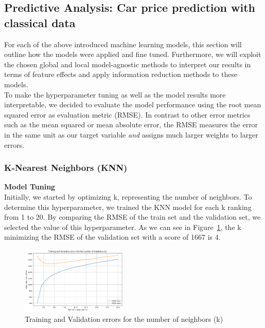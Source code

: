 \documentclass[12pt]{article}
\begin{document}
\subsection{Predictive Analysis: Car price prediction with classical data}
For each of the above introduced machine learning models, this section will outline how the models were applied and fine tuned. Furthermore, we will exploit the chosen global and local model-agnostic methods to interpret our results in terms of feature effects and apply information reduction methods to these models.\\

\noindent To make the hyperparameter tuning as well as the model results more interpretable, we decided to evaluate the model performance using the root mean squared error as evaluation metric (RMSE). In contrast to other error metrics such as the mean squared or mean absolute error, the RMSE measures the error in the same unit as our target variable \textit{and} assigns much larger weights to larger errors.

\newpage

\subsubsection{K-Nearest Neighbors (KNN)}
\noindent \textbf{Model Tuning}\\
\noindent Initially, we started by optimizing k, representing the number of neighbors. To determine this hyperparameter, we trained the KNN model for each k ranking from 1 to 20. By comparing the RMSE of the train set and the validation set, we selected the value of this hyperparameter. As we can see in Figure~\ref{Optimal k}, the k minimizing the RMSE of the validation set with a score of 1667 is 4. 

\FloatBarrier
\begin{figure}[ht]
    \centering
    \includegraphics[width=0.45\textwidth]{Nb k.png}
    \caption{Training and Validation errors for the number of neighbors (k)}
    \label{Optimal k}
\end{figure}
\FloatBarrier
\end{document}
